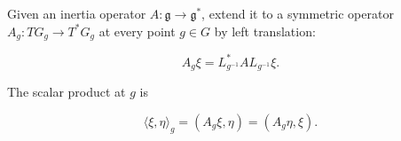 Given an inertia operator $A: \mathfrak{g} \to \mathfrak{g}^*$, extend it to a symmetric operator $A_g: TG_g \to T^*G_g$ at every point $g \in G$ by left translation:

$$A_g \xi = L_{g^{-1}}^* A L_{g^{-1}} \xi.$$

The scalar product at $g$ is

$$\langle \xi, \eta \rangle_g = (A_g \xi, \eta) = (A_g \eta, \xi).$$
